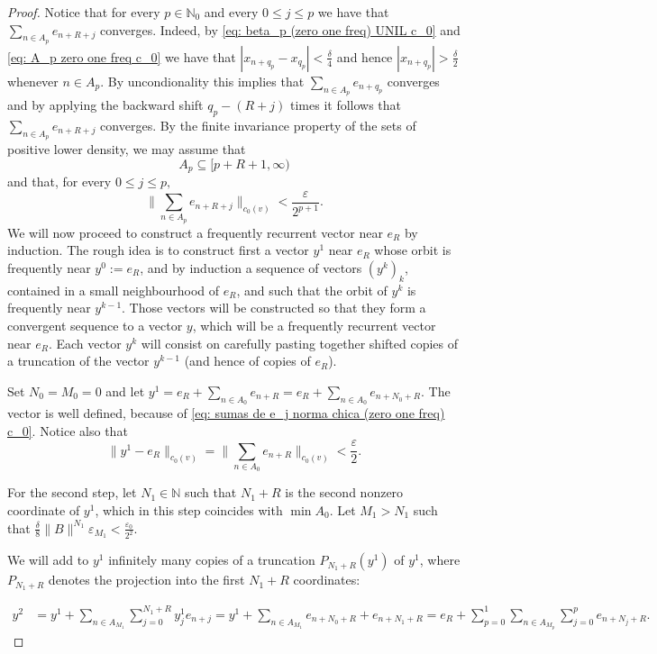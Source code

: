 \documentclass[11pt]{amsart}
\newcommand{\zN}{\mathbb N}
\newcommand{\sub}{\subseteq}
\begin{document}
\begin{proof}
Notice that for every $p\in\zN_0$ and every $0\leq j\leq p$ we have that   $\sum_{n\in A_p} e_{n+R+j}$ converges. Indeed, by \eqref{eq: beta_p (zero one freq) UNIL c_0} and \eqref{eq: A_p zero one freq c_0} we have that $|x_{n+q_p}-x_{q_p}|<\frac{\delta}{4}$ and hence $|x_{n+q_p}|>\frac{\delta}{2}$ whenever $n\in A_p$. By uncondionality this implies that $\sum_{n\in A_p} e_{n+q_p}$ converges and by applying the backward shift $q_p-(R+j)$ times it follows that $\sum_{n\in A_p} e_{n+R+j}$ converges.  By the finite invariance property of  the sets of positive lower density, we may assume that 
\begin{equation}\label{eq A_p empieza en p c_0}
    A_p\sub [p+R+1,\infty)
\end{equation} and that,  for every $0\le j\le p,$
\begin{equation}\label{eq: sumas de e_j norma chica (zero one freq) c_0}
 \|\sum_{n\in A_p} e_{n+R+j}\|_{c_0(v)}<\frac{\varepsilon}{2^{p+1}}.   
\end{equation}
We will now proceed to construct a frequently recurrent vector near $e_R$ by induction. The rough idea is to construct first a vector $y^1$ near $e_R$ whose orbit is frequently near $y^0:=e_R$, and by induction a sequence of vectors $(y^k)_k$, contained in a small neighbourhood of $e_R$, and such that the orbit of $y^k$ is frequently near $y^{k-1}$. Those vectors will be constructed so that they   form a convergent sequence to a vector $y$, which will be a frequently recurrent vector near $e_R.$ Each vector $y^k$ will consist on carefully pasting together shifted copies of a truncation of the vector $y^{k-1}$ (and hence of copies of $e_R$).
 
Set $N_0=M_0=0$ and let $y^1=e_R+\sum_{n\in A_0}
e_{n+R}=e_R+\sum_{n\in A_0}
e_{n+N_0+R}$.  The vector is well defined, because of \eqref{eq: sumas de e_j norma chica (zero one freq) c_0}. Notice also that
$$\|y^1-e_R\|_{c_0(v)}=\|\sum_{n\in A_0}
e_{n+R}\|_{c_0(v)}<\frac{\varepsilon}{2}.$$

For the second step, let $N_1\in\zN$ such that $N_1+R$ is the second nonzero coordinate of $y^1$, which in this step coincides with $\min A_0$. Let $M_1>N_1$  such that $ \frac{\delta}{8}\|B\|^{N_{1}}\varepsilon_{M_{1}}<\frac{\varepsilon_0}{2^{2}}$.

We will add to $y^1$ infinitely many copies of a truncation $P_{N_1+R}(y^1)$ of $y^1$, where $P_{N_1+R}$ denotes the projection into the first $N_1+R$ coordinates:

\begin{align*}
  y^2&=y^1+\sum_{n\in A_{M_1}}\sum_{j=0}^{N_1+R} y^1_j e_{n+j} =y^1+\sum_{n\in A_{M_1}}e_{n+N_0+R}+e_{n+N_1+R}  =e_R+\sum_{p=0}^{1}\sum_{n\in A_{M_p}}\sum_{j=0}^p e_{n+N_j+R}.
  \end{align*}


\end{proof}
\end{document}
